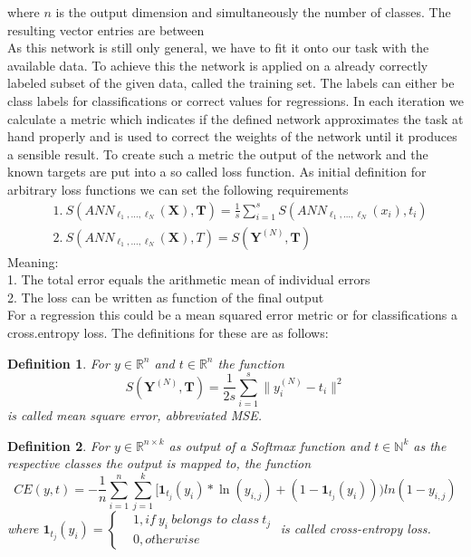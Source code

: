 \documentclass[a4paper,12pt,titlepage,enabledeprecatedfontcommands]{scrreprt}
\newtheorem{definition}{Definition}[chapter]
\begin{document}
where $n$ is the output dimension and simultaneously the number of classes. The resulting vector entries are between \\
As this network is still only general, we have to fit it onto our task with the available data. To achieve this the network is applied on a already correctly labeled subset of the given data, called the training set. The labels can either be class labels for classifications or correct values for regressions. In each iteration we calculate a metric which indicates if the defined network approximates the task at hand properly and is used to correct the weights of the network until it produces a sensible result.
To create such a metric the output of the network and the known targets are put into a so called loss function. As initial definition for arbitrary loss functions we can set the following requirements
\begin{align}
&1. \ S(ANN_{\ell_1,\ldots,\ell_N}(\bm{X}),\bm{T}) = \frac{1}{s} \sum_{i=1}^{s} S(ANN_{\ell_1,\ldots,\ell_N}(x_i),t_i) \\
&2. \  S(ANN_{\ell_1,\ldots,\ell_N}(\bm{X}),T) = S(\bm{Y}^{(N)},\bm{T})
\end{align}
Meaning: \\ 1. The total error equals the arithmetic mean of individual errors \\ 2. The loss can be written as function of the final output \\
For a regression this could be a mean squared error metric or for classifications a cross.entropy loss. The definitions for these are as follows: \\
\begin{definition}
For $y \in \mathbb{R}^n$ and $t \in \mathbb{R}^n$ the function
\begin{equation}
S(\bm{Y}^{(N)},\bm{T}) = \frac{1}{2s}\sum_{i=1}^{s} \| y^{(N)}_{i} - t_i \|^2
\end{equation}
is called mean square error, abbreviated MSE.
\end{definition}
\begin{definition}
For $y \in \mathbb{R}^{n \times k}$ as output of a Softmax function and $t \in \mathbb{N}^k$ as the respective classes the output is mapped to, the function
\begin{equation}
CE(y,t) = -\frac{1}{n} \sum_{i=1}^{n} \sum_{j=1}^{k} [\bm{1}_{t_j}(y_i)*\ln(y_{i,j})+(1-\bm{1}_{t_j}(y_{i})))ln(1-y_{i,j})
\end{equation}
where $\bm{1}_{t_j}(y_{i}) = \begin{cases}
							&1, \textit{if} \ y_i \ \textit{belongs to class} \ t_j \\
							&0, \textit{otherwise}
							\end{cases}$
is called cross-entropy loss.
\end{definition}
\end{document}
